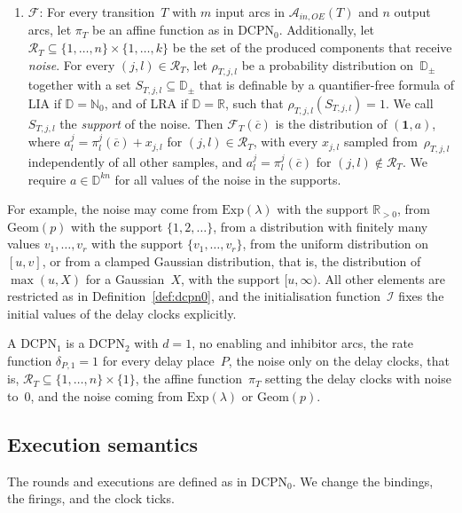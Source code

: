 \documentclass[11pt]{article}
\theoremstyle{definition}
\newcommand{\NatZero}{\mathbb{N}_0}
\newcommand{\Real}{\mathbb{R}}
\newcommand{\Dom}{\mathbb{D}}
\newcommand{\cvec}{\overline{c}}
\newcommand{\DCPN}[1]{\texorpdfstring{\textup{DCPN}\ensuremath{_{#1}}}{DCPN#1}}
\begin{document}
\begin{enumerate}
  \item[10.] $\mathcal{F}$: For every transition~$T$ with $m$ input arcs in
    $\mathcal{A}_{\mathit{in},OE}(T)$ and $n$ output arcs, let $\pi_T$ be an
    affine function as in \DCPN{0}. Additionally, let $\mathcal{R}_T
    \subseteq \{1, \dots, n\} \times \{1, \dots, k\}$ be the set of the
    produced components that receive \emph{noise}. For every $(j, l) \in
    \mathcal{R}_T$, let $\rho_{T, j, l}$ be a probability distribution
    on~$\Dom_\pm$ together with a set $S_{T, j, l} \subseteq \Dom_\pm$ that
    is definable by a quantifier-free formula of LIA if $\Dom = \NatZero$,
    and of LRA if $\Dom = \Real$, such that $\rho_{T, j, l}(S_{T, j, l}) = 1$.
    We call $S_{T, j, l}$ the \emph{support} of the noise. Then
    $\mathcal{F}_T(\cvec)$ is the distribution of $(\mathbf{1}, a)$, where
    $a^j_l = \pi^j_l(\cvec) + x_{j, l}$ for $(j, l) \in \mathcal{R}_T$, with
    every $x_{j, l}$ sampled from~$\rho_{T, j, l}$ independently of all
    other samples, and $a^j_l = \pi^j_l(\cvec)$ for
    $(j, l) \notin \mathcal{R}_T$. We require $a \in \Dom^{kn}$ for all
    values of the noise in the supports.
\end{enumerate}

For example, the noise may come from $\mathrm{Exp}(\lambda)$ with the
support $\Real_{> 0}$, from $\mathrm{Geom}(p)$ with the support
$\{1, 2, \dots\}$, from a distribution with finitely many values
$v_1, \dots, v_r$ with the support $\{v_1, \dots, v_r\}$, from the uniform
distribution on $[u, v]$, or from a clamped Gaussian distribution, that is,
the distribution of $\max(u, X)$ for a Gaussian~$X$, with the support
$[u, \infty)$. All other elements are restricted as in
Definition~\ref{def:dcpn0}, and the initialisation function~$\mathcal{I}$
fixes the initial values of the delay clocks explicitly.

A \DCPN{1} is a \DCPN{2} with $d = 1$, no enabling and inhibitor arcs, the
rate function $\delta_{P, 1} = 1$ for every delay place~$P$, the noise only on
the delay clocks, that is, $\mathcal{R}_T \subseteq \{1, \dots, n\} \times
\{1\}$, the affine function~$\pi_T$ setting the delay clocks with noise
to~$0$, and the noise coming from $\mathrm{Exp}(\lambda)$ or
$\mathrm{Geom}(p)$.

\subsection{Execution semantics}

The rounds and executions are defined as in \DCPN{0}. We change the bindings,
the firings, and the clock ticks.
\end{document}
